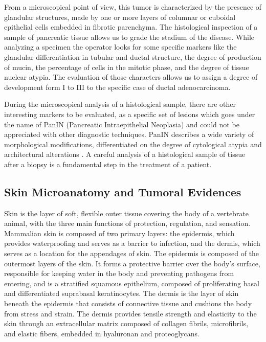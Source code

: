     From a microscopical point of view, this tumor is characterized by the presence of glandular structures, made by one or more layers of columnar or cuboidal epithelial cells embedded in fibrotic parenchyma. The histological inspection of a sample of pancreatic tissue allows us to grade the stadium of the disease. While analyzing a specimen the operator looks for some specific markers like the glandular differentiation in tubular and ductal structure, the degree of production of mucin, the percentage of cells in the mitotic phase, and the degree of tissue nuclear atypia. The evaluation of those characters allows us to assign a degree of development form I to III to the specific case of ductal adenocarcinoma.

    During the microscopical analysis of a histological sample, there are other interesting markers to be evaluated, as a specific set of lesions which goes under the name of PanIN (Pancreatic Intraepithelial Neoplasia) and could not be appreciated with other diagnostic techniques. PanIN describes a wide variety of morphological modifications, differentiated on the degree of cytological atypia and architectural alterations \cite{pmid18787611}. A careful analysis of a histological sample of tissue after a biopsy is a fundamental step in the treatment of a patient.

\subsection{Skin Microanatomy and Tumoral Evidences} \label{ssec:derm_anat}
    Skin is the layer of soft, flexible outer tissue covering the body of a vertebrate animal, with the three main functions of protection, regulation, and sensation. Mammalian skin is composed of two primary layers: the epidermis, which provides waterproofing and serves as a barrier to infection, and the dermis, which serves as a location for the appendages of skin. The epidermis is composed of the outermost layers of the skin. It forms a protective barrier over the body's surface, responsible for keeping water in the body and preventing pathogens from entering, and is a stratified squamous epithelium, composed of proliferating basal and differentiated suprabasal keratinocytes. The dermis is the layer of skin beneath the epidermis that consists of connective tissue and cushions the body from stress and strain. The dermis provides tensile strength and elasticity to the skin through an extracellular matrix composed of collagen fibrils, microfibrils, and elastic fibers, embedded in hyaluronan and proteoglycans.

